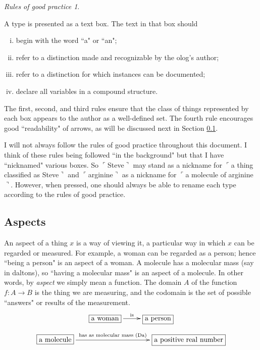 \documentclass{book}
\def\tn{\textnormal}
\def\to{\rightarrow}
\def\taking{\colon}
\newcommand{\LA}[2]{\ar[#1]^-{\tn {#2}}}
\newcommand{\fakebox}[1]{\tn{$\ulcorner$#1$\urcorner$}}
\theoremstyle{remark}
\newtheorem{rules}[subsubsection]{Rules of good practice}
\theoremstyle{definition}
\begin{document}
\begin{rules}\label{rules:types}

A type is presented as a text box.  The text in that box should 
\begin{enumerate}[(i)]
\item begin with the word ``a" or ``an";
\item refer to a distinction made and recognizable by the olog's author;
\item refer to a distinction for which instances can be documented;
\item declare all variables in a compound structure. 
\end{enumerate}

\end{rules}

The first, second, and third rules ensure that the class of things represented by each box appears to the author as a well-defined set.  The fourth rule encourages good ``readability" of arrows, as will be discussed next in Section \ref{sec:aspects}.  

I will not always follow the rules of good practice throughout this document.  I think of these rules being followed ``in the background" but that I have ``nicknamed" various boxes.  So \fakebox{Steve} may stand as a nickname for \fakebox{a thing classified as Steve} and \fakebox{arginine} as a nickname for \fakebox{a molecule of arginine}. However, when pressed, one should always be able to rename each type according to the rules of good practice.


\subsection{Aspects}\label{sec:aspects}

An aspect of a thing $x$ is a way of viewing it, a particular way in which $x$ can be regarded or measured.  For example, a woman can be regarded as a person; hence ``being a person" is an aspect of a woman.  A molecule has a molecular mass (say in daltons), so ``having a molecular mass" is an aspect of a molecule.  In other words, by {\em aspect} we simply mean a function. The domain $A$ of the function $f\taking A\to B$ is the thing we are measuring, and the codomain is the set of possible ``answers" or results of the measurement. 
\begin{align}\label{dia:aspect 1}\xymatrixnocompile{\fbox{a woman}\LA{r}{is}&\fbox{a person}}\end{align}\begin{align}\label{dia:aspect 2}\xymatrixnocompile{\fbox{a molecule}\LA{rr}{has as molecular mass (Da)}&\hspace{.7in}&\fbox{a positive real number}}\end{align}
\end{document}
